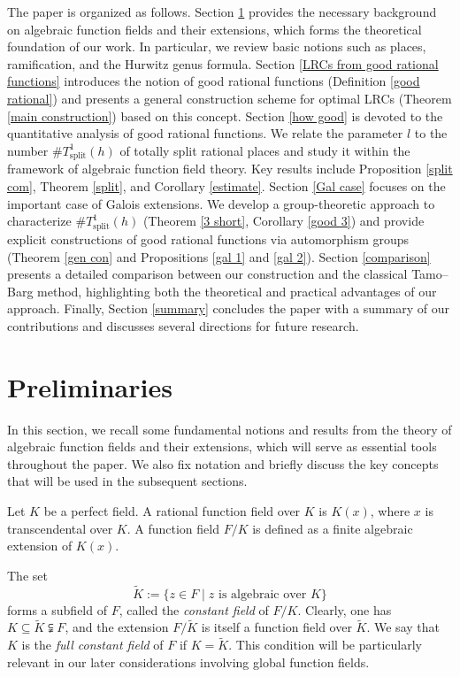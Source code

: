 \documentclass[1p,final]{elsarticle}
\newtheorem{open problem}[theorem]{Open Problem}
\begin{document}
The paper is organized as follows. Section \ref{pre} provides the necessary background on algebraic function fields and their extensions, which forms the theoretical foundation of our work. In particular, we review basic notions such as places, ramification, and the Hurwitz genus formula. Section \ref{LRCs from good rational functions} introduces the notion of good rational functions (Definition \ref{good rational}) and presents a general construction scheme for optimal LRCs (Theorem \ref{main construction}) based on this concept. Section \ref{how good} is devoted to the quantitative analysis of good rational functions. We relate the parameter $l$ to the number $\#T^1_{\text{split}}(h)$ of totally split rational places and study it within the framework of algebraic function field theory. Key results include Proposition \ref{split com}, Theorem \ref{split}, and Corollary \ref{estimate}. Section \ref{Gal case} focuses on the important case of Galois extensions. We develop a group-theoretic approach to characterize $\#T^1_{\text{split}}(h)$ (Theorem \ref{3 short}, Corollary \ref{good 3}) and provide explicit constructions of good rational functions via automorphism groups (Theorem \ref{gen con} and Propositions \ref{gal 1} and \ref{gal 2}).
Section \ref{comparison} presents a detailed comparison between our construction and the classical Tamo--Barg method, highlighting both the theoretical and practical advantages of our approach.
Finally, Section \ref{summary} concludes the paper with a summary of our contributions and discusses several directions for future research.



\section{Preliminaries}\label{pre}

In this section, we recall some fundamental notions and results from the theory of algebraic function fields and their extensions, which will serve as essential tools throughout the paper. We also fix notation and briefly discuss the key concepts that will be used in the subsequent sections.

\medskip

Let \( K \) be a perfect field. A rational function field over \( K \) is \( K(x) \), where \( x \) is transcendental over \( K \). A function field $F/K$ is defined as a finite algebraic extension of $K(x)$.

The set 
\[
\tilde{K}:=\{z\in F \mid z \text{ is algebraic over } K\}
\]
forms a subfield of $F$, called the \emph{constant field} of $F/K$. Clearly, one has $K \subseteq \tilde{K} \subsetneqq F$, and the extension $F/\tilde{K}$ is itself a function field over $\tilde{K}$. We say that $K$ is the \emph{full constant field} of $F$ if $K = \tilde{K}$. This condition will be particularly relevant in our later considerations involving global function fields.
\end{document}

